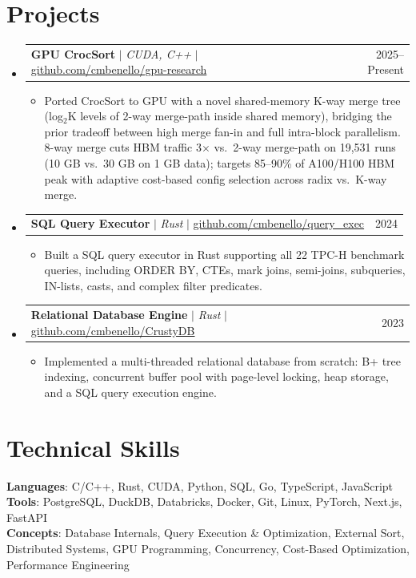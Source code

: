 \documentclass[letterpaper,10pt]{article}
\makeatletter
\newcommand{\resumeItem}[1]{
  \item\small{
    {#1 \vspace{-3pt}}
  }
}
\newcommand{\resumeProjectHeading}[2]{
    \item
    \begin{tabular*}{0.99\textwidth}{l@{\extracolsep{\fill}}r}
      \small#1 & #2 \\
    \end{tabular*}\vspace{-8pt}
}
\newcommand{\resumeSubHeadingListStart}{\begin{itemize}[leftmargin=0.015in, label={}]}
\newcommand{\resumeSubHeadingListEnd}{\end{itemize}}
\newcommand{\resumeItemListStart}{\begin{itemize}[leftmargin=0.15in]}
\newcommand{\resumeItemListEnd}{\end{itemize}\vspace{-7pt}}
\makeatother
\begin{document}
\section{Projects}
    \resumeSubHeadingListStart
      \resumeProjectHeading
          {\textbf{GPU CrocSort} $|$ \emph{CUDA, C++} $|$ \small{\href{https://github.com/cmbenello/gpu-research}{github.com/cmbenello/gpu-research}}}{2025--Present}
          \resumeItemListStart
            \resumeItem{Ported CrocSort to GPU with a novel shared-memory K-way merge tree (log$_2$K levels of 2-way merge-path inside shared memory), bridging the prior tradeoff between high merge fan-in and full intra-block parallelism. 8-way merge cuts HBM traffic 3$\times$ vs.\ 2-way merge-path on 19,531 runs (10 GB vs.\ 30 GB on 1 GB data); targets 85--90\% of A100/H100 HBM peak with adaptive cost-based config selection across radix vs.\ K-way merge.}
          \resumeItemListEnd
      \resumeProjectHeading
          {\textbf{SQL Query Executor} $|$ \emph{Rust} $|$ \small{\href{https://github.com/cmbenello/query_exec}{github.com/cmbenello/query\_exec}}}{2024}
          \resumeItemListStart
            \resumeItem{Built a SQL query executor in Rust supporting all 22 TPC-H benchmark queries, including ORDER BY, CTEs, mark joins, semi-joins, subqueries, IN-lists, casts, and complex filter predicates.}
          \resumeItemListEnd
      \resumeProjectHeading
          {\textbf{Relational Database Engine} $|$ \emph{Rust} $|$ \small{\href{https://github.com/cmbenello/CrustyDB}{github.com/cmbenello/CrustyDB}}}{2023}
          \resumeItemListStart
            \resumeItem{Implemented a multi-threaded relational database from scratch: B+ tree indexing, concurrent buffer pool with page-level locking, heap storage, and a SQL query execution engine.}
          \resumeItemListEnd
    \resumeSubHeadingListEnd

\section{Technical Skills}
 \begin{itemize}[leftmargin=0.015in, label={}]
    \small{\item{
     \textbf{Languages}{: C/C++, Rust, CUDA, Python, SQL, Go, TypeScript, JavaScript} \\
     \textbf{Tools}{: PostgreSQL, DuckDB, Databricks, Docker, Git, Linux, PyTorch, Next.js, FastAPI} \\
     \textbf{Concepts}{: Database Internals, Query Execution \& Optimization, External Sort, Distributed Systems, GPU Programming, Concurrency, Cost-Based Optimization, Performance Engineering}
    }}
 \end{itemize}\vspace{-9pt}
\end{document}
